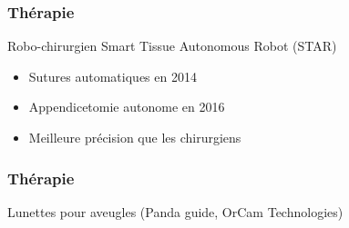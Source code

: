 \begin{frame}
  \frametitle{Thérapie}
  Robo-chirurgien Smart Tissue Autonomous Robot (STAR)
  \begin{itemize}
    \item Sutures automatiques en 2014
    \item Appendicetomie autonome en 2016
    \item Meilleure précision que les chirurgiens
    \end{itemize}
\end{frame}

\begin{frame}
  \frametitle{Thérapie}
  Lunettes pour aveugles (Panda guide, OrCam Technologies)
\end{frame}
